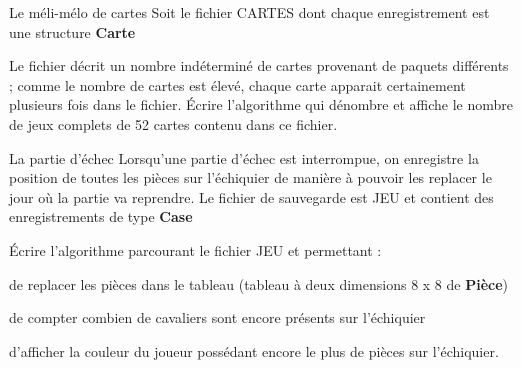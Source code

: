 \begin{Exercice}{Le méli-mélo de cartes}
	Soit le fichier CARTES dont chaque
	enregistrement est une structure \textbf{Carte}


	Le fichier décrit un nombre indéterminé de
	cartes provenant de paquets différents ; comme le nombre de cartes est
	élevé, chaque carte apparait certainement plusieurs fois dans le
	fichier. Écrire l’algorithme qui dénombre et affiche le nombre de jeux
	complets de 52 cartes contenu dans ce fichier.
\end{Exercice}

\begin{Exercice}{La partie d’échec}
	Lorsqu’une partie d’échec est interrompue, on enregistre la position de
	toutes les pièces sur l’échiquier de manière à pouvoir les replacer le
	jour où la partie va reprendre. Le fichier de sauvegarde est JEU et
	contient des enregistrements de type \textbf{Case}
	

	Écrire l’algorithme parcourant le fichier JEU et permettant :

	\begin{liste}
		\item 
			de replacer les pièces dans le tableau 
			(tableau à deux dimensions 8 x 8 de \textbf{Pièce})
		\item 
			de compter combien de cavaliers sont encore présents sur l’échiquier
		\item 
			d’afficher la couleur du joueur possédant encore le plus de pièces sur
			l’échiquier.
	\end{liste}
\end{Exercice}	

